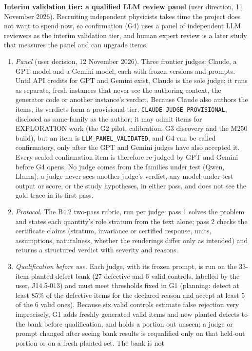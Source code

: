 \documentclass[10pt,a4paper]{article}
\begin{document}
\textbf{Interim validation tier: a qualified LLM review panel} (user direction, 11 November 2026)\label{sec:llmpanel}.
Recruiting independent physicists takes time the project does not want to spend now, so confirmation (G4) uses a
panel of independent LLM reviewers as the interim validation tier, and human expert review is a later study that
measures the panel and can upgrade items.
\begin{enumerate}
\item \emph{Panel} (user decision, 12 November 2026). Three frontier judges: Claude, a GPT model and a Gemini model,
each with frozen versions and prompts. Until API credits for GPT and Gemini exist, Claude is the sole judge: it runs
as separate, fresh instances that never see the authoring context, the generator code or another instance's
verdict. Because Claude also authors the items, its verdicts form a provisional tier,
\texttt{CLAUDE\_JUDGE\_PROVISIONAL}, disclosed as same-family as the author; it may admit items for EXPLORATION work
(the G2 pilot, calibration, G3 discovery and the M250 build), but an item is \texttt{LLM\_PANEL\_VALIDATED}, and G4
can be called confirmatory, only after the GPT and Gemini judges have also accepted it. Every sealed confirmation
item is therefore re-judged by GPT and Gemini before G4 opens. No judge comes from the families under test (Qwen,
Llama); a judge never sees
another judge's verdict, any model-under-test output or score, or the study hypotheses, in either pass, and does
not see the gold trace in its first pass.
\item \emph{Protocol.} The B4.2 two-pass rubric, run per judge: pass 1 solves the problem and states each
quantity's role stratum from the text alone; pass 2 checks the certificate claims (stratum, invariance or certified
response, units, assumptions, naturalness, whether the renderings differ only as intended) and returns a structured
verdict with severity and reasons.
\item \emph{Qualification before use.} Each judge, with its frozen prompt, is run on the 33-item planted-defect bank
(27 defective and 6 valid controls, labelled by the user, J14.5-013) and must meet thresholds fixed in G1 (planning:
detect at least 85\% of the defective items for the declared reason and accept at least 5 of the 6 valid ones).
Because six valid controls estimate false rejection very imprecisely, G1 adds freshly generated valid items and
new planted defects to the bank before qualification, and holds a portion out unseen; a judge or prompt changed
after seeing bank results is requalified only on that held-out portion or on a fresh planted set. The bank is not

\end{enumerate}
\end{document}
